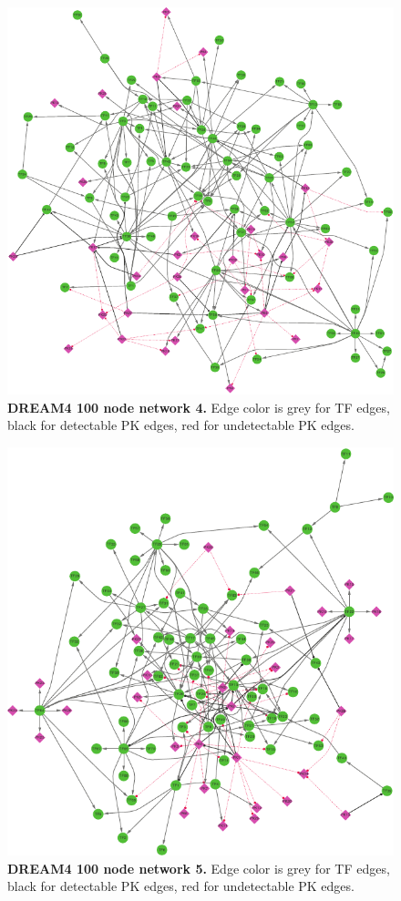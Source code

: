\begin{figure}[ht]
    \centering
    \includegraphics[width=\textwidth]{appendices/fig/net_100_4.pdf}
    \caption{\textbf{DREAM4 100 node network 4.} Edge color is grey for TF edges, black for detectable PK edges, red for undetectable PK edges.}
    \label{fig:dream4_net100.4}
\end{figure}

\begin{figure}[ht]
    \centering
    \includegraphics[width=\textwidth]{appendices/fig/net_100_5.pdf}
    \caption{\textbf{DREAM4 100 node network 5.} Edge color is grey for TF edges, black for detectable PK edges, red for undetectable PK edges.}
    \label{fig:dream4_net100.5}
\end{figure}